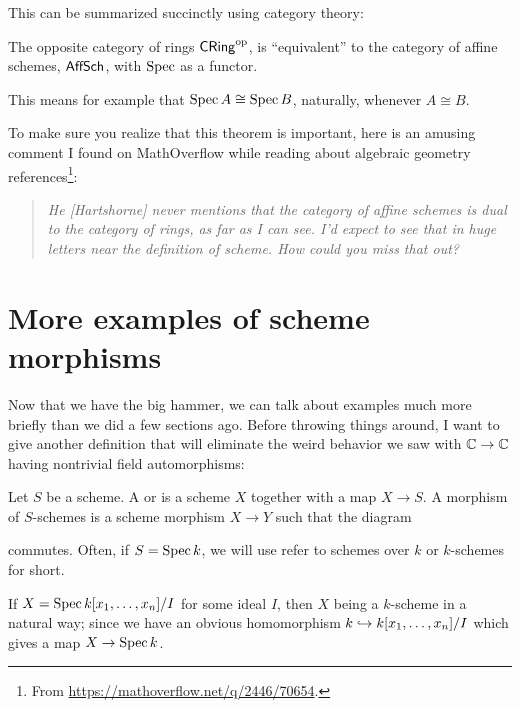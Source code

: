 This can be summarized succinctly using category theory:
\begin{corollary}
	The opposite category of rings $\mathsf{CRing}^{\mathrm{op}}$,
	is ``equivalent'' to the category of affine schemes, $\mathsf{AffSch}$,
	with $\operatorname{Spec}$ as a functor.
\end{corollary}
This means for example that $\operatorname{Spec} A \cong \operatorname{Spec} B$,
naturally, whenever $A \cong B$.

To make sure you realize that this theorem is important,
here is an amusing comment I found on MathOverflow
while reading about algebraic geometry
references\footnote{From \url{https://mathoverflow.net/q/2446/70654}.}:
\begin{quote}
	\small\sffamily\itshape
	He [Hartshorne] never mentions that the category of affine schemes
	is dual to the category of rings, as far as I can see.
	I'd expect to see that in huge letters
	near the definition of scheme.
	How could you miss that out?
\end{quote}

\section{More examples of scheme morphisms}
Now that we have the big hammer,
we can talk about examples much more briefly
than we did a few sections ago.
Before throwing things around,
I want to give another definition
that will eliminate the weird behavior we saw with
$\mathbb C \to \mathbb C$ having nontrivial field automorphisms:
\begin{definition}
	Let $S$ be a scheme.
	A  or  is a scheme $X$
	together with a map $X \to S$.
	A morphism of $S$-schemes is a scheme morphism $X \to Y$
	such that the diagram
	commutes.
	Often, if $S = \operatorname{Spec} k$, we will use refer
	to schemes over $k$ or $k$-schemes for short.
\end{definition}
\begin{example}
	[{$\Spec k[\dots]$}]
	If $X = \operatorname{Spec} k[x_1, \dots, x_n] / I$ for some ideal $I$,
	then $X$ being a $k$-scheme in a natural way;
	since we have an obvious homomorphism
	$k \hookrightarrow k[x_1, \dots, x_n] / I$
	which gives a map $X \to \operatorname{Spec} k$.
\end{example}

